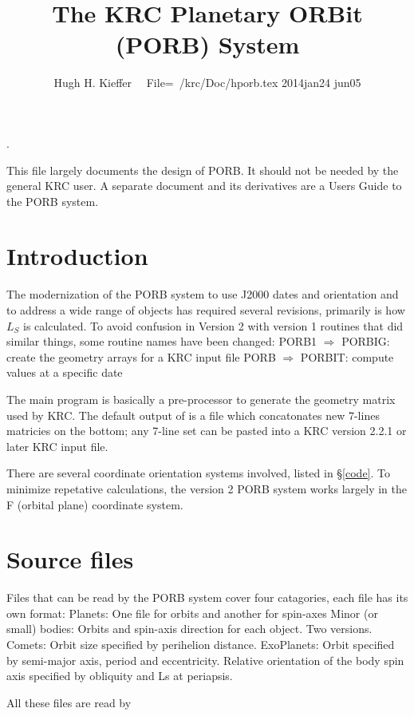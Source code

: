 \documentclass[draft]{article}
\title{The KRC Planetary ORBit (PORB) System}
\author{Hugh H. Kieffer  \ \ File=~/krc/Doc/hporb.tex 2014jan24 jun05}
\begin{document}
\maketitle
\tableofcontents
\hrulefill .\hrulefill

This file largely documents the design of PORB. It should not be needed by
the general KRC user. A separate document  and its derivatives are a
Users Guide to the PORB system.



\section{Introduction} The modernization of the PORB system to use J2000 dates and orientation and to address a wide range of objects has required several revisions, primarily is how $L_S$ is calculated. To avoid confusion in Version 2 with version 1 routines that did similar things, some routine names have been changed:
\qi PORB1 $\Rightarrow$ PORBIG: create the geometry arrays for a KRC input file 
\qi PORB $\Rightarrow$ PORBIT: compute values at a specific date 

The main program  is basically a pre-processor to generate the
geometry matrix used by KRC. The default output of  is a file
 which concatonates new 7-lines matricies on the bottom; any
7-line set can be pasted into a KRC version 2.2.1 or later KRC input file.

There are several coordinate orientation systems involved, listed in \S \ref{code}. To minimize repetative calculations, the version 2 PORB system works largely in the F (orbital plane) coordinate system. 

\section{Source files} %
Files that can be read by the PORB system cover four catagories, each file has its own format:
\qi Planets:  One file for orbits and another for spin-axes
\qi Minor (or small) bodies: Orbits and spin-axis direction for each object. Two versions.
\qi Comets: Orbit size specified by perihelion distance. 
\qi ExoPlanets: Orbit specified by semi-major axis, period and eccentricity. Relative orientation of the body spin axis specified by obliquity and Ls at periapsis.

All these files are read by  
\end{document}

